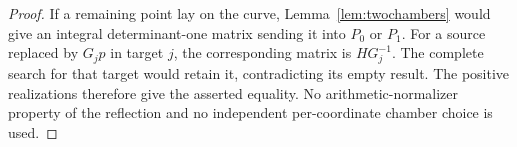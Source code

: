 \begin{proof}
If a remaining point lay on the curve, Lemma~\ref{lem:twochambers} would
give an integral determinant-one matrix sending it into $P_0$ or $P_1$.
For a source replaced by $G_jp$ in target $j$, the corresponding matrix
is $HG_j^{-1}$. The complete search for that target would retain it,
contradicting its empty result. The positive realizations therefore
give the asserted equality. No arithmetic-normalizer property of the
reflection and no independent per-coordinate chamber choice is used.
\end{proof}

